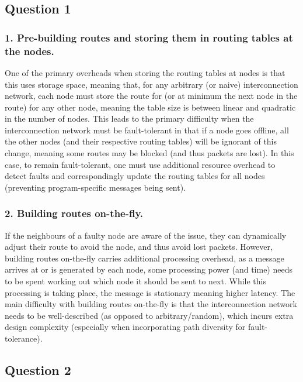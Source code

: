 \subsection*{Question 1}

\subsubsection*{1. Pre-building routes and storing them in routing tables at the nodes.}

One of the primary overheads when storing the routing tables at nodes is that this uses storage space, meaning that, for any arbitrary (or naive) interconnection network, each node must store the route for (or at minimum the next node in the route) for any other node, meaning the table size is between linear and quadratic in the number of nodes.
This leads to the primary difficulty when the interconnection network must be fault-tolerant in that if a node goes offline, all the other nodes (and their respective routing tables) will be ignorant of this change, meaning some routes may be blocked (and thus packets are lost).
In this case, to remain fault-tolerant, one must use additional resource overhead to detect faults and correspondingly update the routing tables for all nodes (preventing program-specific messages being sent).

\subsubsection*{2. Building routes on-the-fly.}

If the neighbours of a faulty node are aware of the issue, they can dynamically adjust their route to avoid the node, and thus avoid lost packets.
However, building routes on-the-fly carries additional processing overhead, as a message arrives at or is generated by each node, some processing power (and time) needs to be spent working out which node it should be sent to next.
While this processing is taking place, the message is stationary meaning higher latency.
The main difficulty with building routes on-the-fly is that the interconnection network needs to be well-described (as opposed to arbitrary/random), which incurs extra design complexity (especially when incorporating path diversity for fault-tolerance).

\pagebreak


\subsection*{Question 2}


